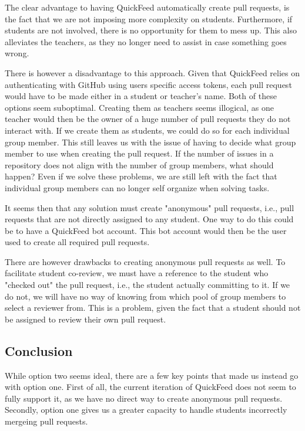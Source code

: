 The clear advantage to having QuickFeed automatically create pull requests, is the fact that we are not imposing more complexity on students.
Furthermore, if students are not involved, there is no opportunity for them to mess up.
This also alleviates the teachers, as they no longer need to assist in case something goes wrong.

There is however a disadvantage to this approach.
Given that QuickFeed relies on authenticating with GitHub using users specific access tokens, each pull request would have to be made either in a student or teacher's name.
Both of these options seem suboptimal.
Creating them as teachers seems illogical, as one teacher would then be the owner of a huge number of pull requests they do not interact with.
If we create them as students, we could do so for each individual group member.
This still leaves us with the issue of having to decide what group member to use when creating the pull request.
If the number of issues in a repository does not align with the number of group members, what should happen?
Even if we solve these problems, we are still left with the fact that individual group members can no longer self organize when solving tasks.

It seems then that any solution must create "anonymous" pull requests, i.e., pull requests that are not directly assigned to any student.
One way to do this could be to have a QuickFeed bot account.
This bot account would then be the user used to create all required pull requests.

There are however drawbacks to creating anonymous pull requests as well.
To facilitate student co-review, we must have a reference to the student who "checked out" the pull request, i.e., the student actually committing to it.
If we do not, we will have no way of knowing from which pool of group members to select a reviewer from.
This is a problem, given the fact that a student should not be assigned to review their own pull request.

\subsection{Conclusion}

While option two seems ideal, there are a few key points that made us instead go with option one.
First of all, the current iteration of QuickFeed does not seem to fully support it, as we have no direct way to create anonymous pull requests.
Secondly, option one gives us a greater capacity to handle students incorrectly mergeing pull requests.


